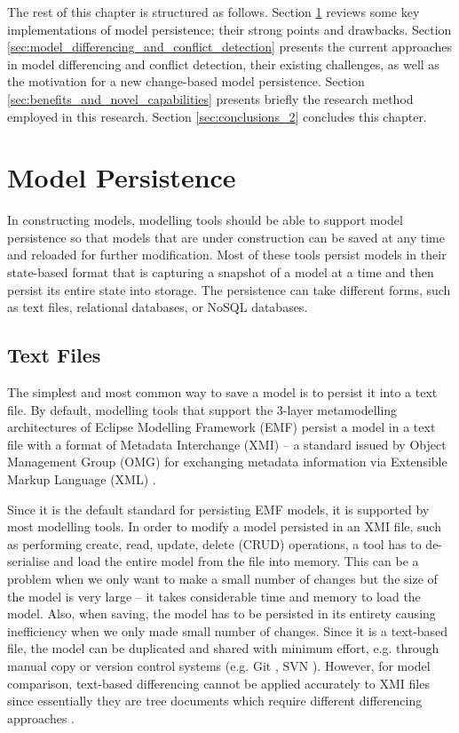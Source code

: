 The rest of this chapter is structured as follows. Section \ref{sec:model_persistence} reviews some key implementations of model persistence; their strong points and drawbacks. Section \ref{sec:model_differencing_and_conflict_detection} presents the current approaches in model differencing and conflict detection, their existing challenges, as well as the motivation for a new change-based model persistence. Section \ref{sec:benefits_and_novel_capabilities} presents briefly the research method employed in this research. Section \ref{sec:conclusions_2} concludes this chapter.

\section{Model Persistence}
\label{sec:model_persistence}
In constructing models, modelling tools should be able to support model persistence so that models that are under construction can be saved at any time and reloaded for further modification. Most of these tools persist models in their state-based format that is capturing a snapshot of a model at a time and then persist its entire state into storage. The persistence can take different forms, such as text files, relational databases, or NoSQL databases.

\subsection{Text Files}
\label{sec:text_file}
The simplest and most common way to save a model is to persist it into a text file. By default, modelling tools that support the 3-layer metamodelling architectures of Eclipse Modelling Framework (EMF) \cite{steinberg2008emf} persist a model in a text file with a format of Metadata Interchange (XMI) -- a standard issued by Object Management Group (OMG) for exchanging metadata information via Extensible Markup Language (XML) \cite{omg2018xmi}. 

Since it is the default standard for persisting EMF models, it is supported by  most modelling tools. In order to modify a model persisted in an XMI file, such as performing create, read, update, delete (CRUD) operations, a tool has to de-serialise and load the entire model from the file into memory. This can be a problem when we only want to make a small number of changes but the size of the model is very large -- it takes considerable time and memory to load the model. Also, when saving, the model has to be persisted in its entirety causing inefficiency when we only made small number of changes. Since it is a text-based file, the model can be duplicated and shared with minimum effort, e.g. through manual copy or version control systems (e.g. Git \cite{git2019about}, SVN \cite{apache2019svn}). However, for model comparison, text-based differencing \cite{DBLP:journals/algorithmica/Meyers86} cannot be applied accurately to XMI files since essentially they are tree documents which require different differencing approaches \cite{wang2003xdiff}.

